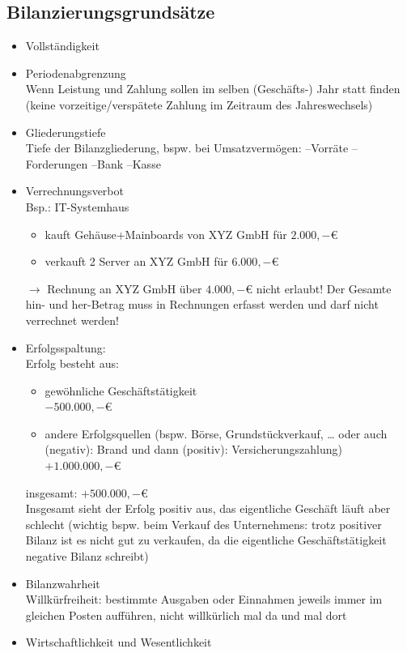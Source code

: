 \subsection{Bilanzierungsgrundsätze}
\begin{itemize}
\item Vollständigkeit
\item Periodenabgrenzung\\
Wenn Leistung und Zahlung sollen im selben (Geschäfts-) Jahr statt finden (keine vorzeitige/verspätete Zahlung im Zeitraum des Jahreswechsels)
\item Gliederungstiefe\\
Tiefe der Bilanzgliederung, bspw. bei Umsatzvermögen: --Vorräte --Forderungen --Bank --Kasse
\item Verrechnungsverbot\\
Bsp.: IT-Systemhaus 
\begin{itemize}
\item kauft Gehäuse+Mainboards von XYZ GmbH für $2.000,-$\euro{}
\item verkauft 2 Server an XYZ GmbH für $6.000,-$\euro{}
\end{itemize}
$\to$ Rechnung an XYZ GmbH über $4.000,-$\euro{} nicht erlaubt! Der Gesamte hin- und her-Betrag muss in Rechnungen erfasst werden und darf nicht verrechnet werden!
\item Erfolgsspaltung:\\
Erfolg besteht aus:
\begin{itemize}
\item gewöhnliche Geschäftstätigkeit\\
$-500.000,-$\euro{}
\item andere Erfolgsquellen (bspw. Börse, Grundstückverkauf, … oder auch (negativ): Brand und dann (positiv): Versicherungszahlung)\\
$+1.000.000,-$\euro{}
\end{itemize}
insgesamt: $+500.000,-$\euro{}\\
Insgesamt sieht der Erfolg positiv aus, das eigentliche Geschäft läuft aber schlecht (wichtig bspw. beim Verkauf des Unternehmens: trotz positiver Bilanz ist es nicht gut zu verkaufen, da die eigentliche Geschäftstätigkeit negative Bilanz schreibt)
\item Bilanzwahrheit\\
Willkürfreiheit: bestimmte Ausgaben oder Einnahmen jeweils immer im gleichen Posten aufführen, nicht willkürlich mal da und mal dort
\item Wirtschaftlichkeit und Wesentlichkeit\\

\end{itemize}
